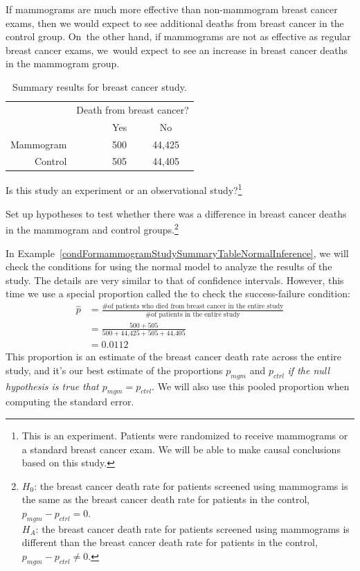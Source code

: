 If mammograms are much more effective than non-mammogram breast cancer exams, then we would expect to see additional deaths from breast cancer in the control group. On~the other hand, if mammograms are not as effective as regular breast cancer exams, we~would expect to see an increase in breast cancer deaths in the mammogram group.

\begin{table}[h]
\centering
\begin{tabular}{rrcc}
	& \multicolumn{3}{c}{Death from breast cancer?} \\
  \cline{2-4}
 & \ \hspace{3mm}\ & Yes & No \\
  \hline
Mammogram && 500 & 44,425 \\
Control && 505 & 44,405 \\
   \hline
\end{tabular}
\caption{Summary results for breast cancer study.}
\label{mammogramStudySummaryTable}
\end{table}

\begin{exercise}
Is this study an experiment or an observational study?\footnote{This is an experiment. Patients were randomized to receive mammograms or a standard breast cancer exam. We will be able to make causal conclusions based on this study.}
\end{exercise}

\begin{exercise} \label{htFormammogramStudySummaryTable}
Set up hypotheses to test whether there was a difference in breast cancer deaths in the mammogram and control groups.\footnote{$H_0$: the breast cancer death rate for patients screened using mammograms is the same as the breast cancer death rate for patients in the control, $p_{mgm} - p_{ctrl} = 0$. \\ $H_A$: the breast cancer death rate for patients screened using mammograms is different than the breast cancer death rate for patients in the control, $p_{mgm} - p_{ctrl} \neq 0$.}
\end{exercise}

In Example~\ref{condFormammogramStudySummaryTableNormalInference}, we will check the conditions for using the normal model to analyze the results of the study. The details are very similar to that of confidence intervals. However, this time we use a special proportion called the  to check the success-failure condition:
\begin{align*}
\hat{p} &= \frac{\text{\# of patients who died from breast cancer in the entire study}}{\text{\# of patients in the entire study}} \\
	&= \frac{500 + 505}{500 + \text{44,425} + 505 + \text{44,405}} \\
	&= 0.0112
\end{align*}
This proportion is an estimate of the breast cancer death rate across the entire study, and it's our best estimate of the proportions $p_{mgm}$ and $p_{ctrl}$ \emph{if the null hypothesis is true that $p_{mgm} = p_{ctrl}$}. We will also use this pooled proportion when computing the standard error.

